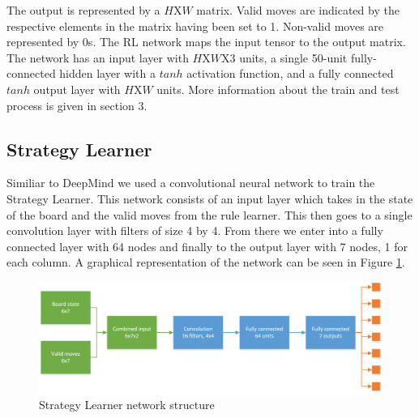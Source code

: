 The output is represented by a $H$X$W$ matrix. Valid moves are indicated by the respective elements in the matrix having been set to 1. Non-valid moves are represented by 0s.
The RL network maps the input tensor to the output matrix. The network has an input layer with $H$X$W$X$3$ units, a single 50-unit fully-connected hidden layer with a $tanh$ activation function, and a fully connected $tanh$ output layer with $H$X$W$ units. More information about the train and test process is given in section 3.

\subsection{Strategy Learner}
Similiar to DeepMind we used a convolutional neural network to train the Strategy Learner. This network consists of an input layer which takes in the state of the board and the valid moves from the rule learner. This then goes to a single convolution layer with filters of size 4 by 4. From there we enter into a fully connected layer with 64 nodes and finally to the output layer with 7 nodes, 1 for each column. A graphical representation of the network can be seen in Figure \ref{fig:strat_learn}.

\begin{figure}
  \includegraphics[width=\linewidth]{Network1.png}
  \caption{Strategy Learner network structure}
  \label{fig:strat_learn}
\end{figure}
